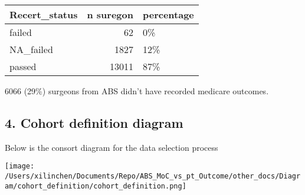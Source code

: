 \documentclass[
]{article}
\begin{document}
\begin{table}[H]
\centering
\begin{tabular}{l|r|l}
\hline
Recert\_status & n suregon & percentage\\
\hline
failed & 62 & 0\%\\
\hline
NA\_failed & 1827 & 12\%\\
\hline
passed & 13011 & 87\%\\
\hline
\end{tabular}
\end{table}

6066 (29\%) surgeons from ABS didn't have recorded medicare outcomes.

\hypertarget{cohort-definition-diagram}{%
\subsection{4. Cohort definition
diagram}\label{cohort-definition-diagram}}

Below is the consort diagram for the data selection process

\texttt{[image: /Users/xilinchen/Documents/Repo/ABS\_MoC\_vs\_pt\_Outcome/other\_docs/Diagram/cohort\_definition/cohort\_definition.png]}
\end{document}
